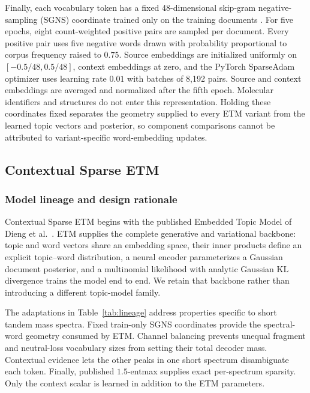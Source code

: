 \documentclass[10pt,a4paper]{article}
\begin{document}
Finally, each vocabulary token has a fixed 48-dimensional skip-gram
negative-sampling (SGNS) coordinate trained only on the training documents
\cite{mikolov2013}. For five epochs, eight count-weighted positive pairs are
sampled per document. Every positive pair uses five negative words drawn with
probability proportional to corpus frequency raised to $0.75$. Source
embeddings are initialized uniformly on $[-0.5/48,0.5/48]$, context embeddings
at zero, and the PyTorch SparseAdam optimizer uses learning rate $0.01$ with
batches of 8,192 pairs.
Source and context embeddings are averaged and normalized after the fifth
epoch. Molecular identifiers and structures do not enter this representation.
Holding these coordinates fixed separates the geometry supplied to every ETM
variant from the learned topic vectors and posterior, so component comparisons
cannot be attributed to variant-specific word-embedding updates.

\subsection{Contextual Sparse ETM}

\subsubsection{Model lineage and design rationale}

Contextual Sparse ETM begins with the published Embedded Topic Model of
Dieng et al.\ \cite{dieng2020}. ETM supplies the complete generative and
variational backbone: topic and word vectors share an embedding space, their
inner products define an explicit topic--word distribution, a neural encoder
parameterizes a Gaussian document posterior, and a multinomial likelihood with
analytic Gaussian KL divergence trains the model end to end. We retain that backbone rather
than introducing a different topic-model family.

The adaptations in Table~\ref{tab:lineage} address properties specific to short
tandem mass spectra. Fixed train-only SGNS coordinates provide the spectral-word
geometry consumed by ETM. Channel balancing prevents unequal fragment and
neutral-loss vocabulary sizes from setting their total decoder mass. Contextual
evidence lets the other peaks in one short spectrum disambiguate each token.
Finally, published $1.5$-entmax supplies exact per-spectrum sparsity. Only the
context scalar is learned in addition to the ETM parameters.
\end{document}
